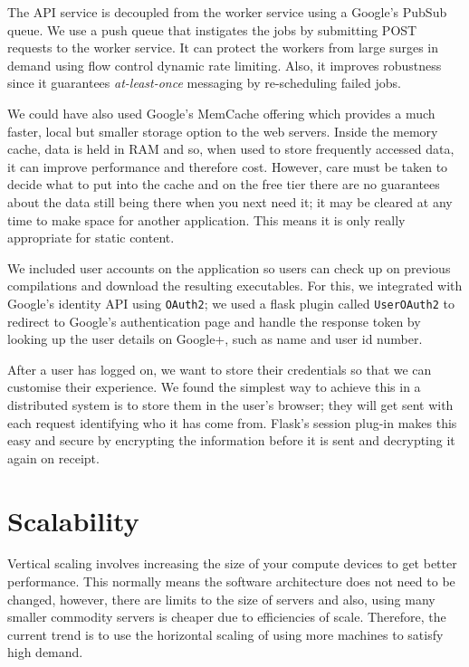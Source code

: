 \documentclass[conference]{IEEEtran}
\begin{document}
The API service is decoupled from the worker service using a Google's PubSub
queue\cite{pubsub}. We use a push queue that instigates the jobs by submitting
POST requests to the worker service. It can protect the workers from large
surges in demand using flow control dynamic rate limiting. Also, it improves
robustness since it guarantees \emph{at-least-once} messaging by re-scheduling
failed jobs.

We could have also used Google's MemCache\cite{mem} offering which provides a
much faster, local but smaller storage option to the web servers. Inside the
memory cache, data is held in RAM and so, when used to store frequently accessed
data, it can improve performance and therefore cost. However, care must be taken
to decide what to put into the cache and on the free tier there are no
guarantees about the data still being there when you next need it; it may
be cleared at any time to make space for another application. This means
it is only really appropriate for static content.

We included user accounts on the application so users can check up on previous
compilations and download the resulting executables. For this, we integrated
with Google's identity API using \texttt{OAuth2}; we used a flask
plugin called \texttt{UserOAuth2}\cite{oauth} to redirect to Google's
authentication page and handle the response token by looking up the user details 
on Google+, such as name and user id number.

After a user has logged on, we want to store their credentials so that we can
customise their experience. We found the simplest way to achieve this in a
distributed system is to store them in the user's browser; they will get sent
with each request identifying who it has come from. Flask's session plug-in
makes this easy and secure by encrypting the information before it is sent and
decrypting it again on receipt.

\section{Scalability}
Vertical scaling involves increasing the size of your compute devices to get
better performance. This normally means the software architecture does not need to be
changed, however, there are limits to the size of servers and also, using many
smaller commodity servers is cheaper due to efficiencies of scale. Therefore,
the current trend is to use the horizontal scaling of using more machines to
satisfy high demand.
\end{document}
